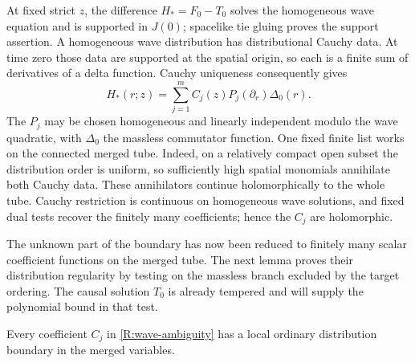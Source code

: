 At fixed strict $z$, the difference $H_*=F_0-T_0$ solves the
homogeneous wave equation and is supported in $J(0)$; spacelike tie
gluing proves the support assertion.  A homogeneous wave distribution
has distributional Cauchy data.  At time zero those data are supported
at the spatial origin, so each is a finite sum of derivatives of a
delta function.  Cauchy uniqueness consequently gives
\begin{equation}\label{R:wave-ambiguity}
 H_*(r;z)=\sum_{j=1}^m C_j(z)P_j(\partial_r)\Delta_0(r).
\end{equation}
The $P_j$ may be chosen homogeneous and linearly independent modulo
the wave quadratic, with $\Delta_0$ the massless commutator function.
One fixed finite list works on the connected merged tube.  Indeed,
on a relatively compact open subset the distribution order is
uniform, so sufficiently high spatial monomials annihilate both
Cauchy data.  These annihilators continue holomorphically to the
whole tube.  Cauchy restriction is continuous on homogeneous wave
solutions, and fixed dual tests recover the finitely many coefficients;
hence the $C_j$ are holomorphic.

The unknown part of the boundary has now been reduced to finitely
many scalar coefficient functions on the merged tube.  The next
lemma proves their distribution regularity by testing on the
massless branch excluded by the target ordering.  The causal
solution $T_0$ is already tempered and will supply the polynomial
bound in that test.

\begin{lemma}\label{R:coefficient-distributions}
Every coefficient $C_j$ in \eqref{R:wave-ambiguity} has a local ordinary
distribution boundary in the merged variables.
\end{lemma}

